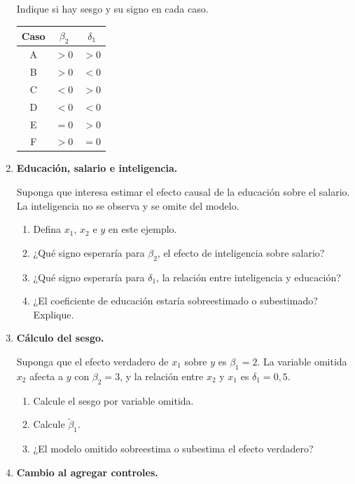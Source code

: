 \documentclass[11pt]{article}
\begin{document}
\begin{enumerate}[label=\textbf{Ejercicio \arabic*.}, leftmargin=*]
Indique si hay sesgo y su signo en cada caso.

\begin{center}
\begin{tabular}{ccc}
\toprule
Caso & $\beta_2$ & $\delta_1$ \\
\midrule
A & $>0$ & $>0$ \\
B & $>0$ & $<0$ \\
C & $<0$ & $>0$ \\
D & $<0$ & $<0$ \\
E & $=0$ & $>0$ \\
F & $>0$ & $=0$ \\
\bottomrule
\end{tabular}
\end{center}

\item \textbf{Educación, salario e inteligencia.}

Suponga que interesa estimar el efecto causal de la educación sobre el salario. La inteligencia no se observa y se omite del modelo.

\begin{enumerate}[label=\alph*)]
    \item Defina $x_1$, $x_2$ e $y$ en este ejemplo.
    \item ¿Qué signo esperaría para $\beta_2$, el efecto de inteligencia sobre salario?
    \item ¿Qué signo esperaría para $\delta_1$, la relación entre inteligencia y educación?
    \item ¿El coeficiente de educación estaría sobreestimado o subestimado? Explique.
\end{enumerate}

\item \textbf{Cálculo del sesgo.}

Suponga que el efecto verdadero de $x_1$ sobre $y$ es $\beta_1=2$. La variable omitida $x_2$ afecta a $y$ con $\beta_2=3$, y la relación entre $x_2$ y $x_1$ es $\delta_1=0{,}5$.

\begin{enumerate}[label=\alph*)]
    \item Calcule el sesgo por variable omitida.
    \item Calcule $\tilde{\beta}_1$.
    \item ¿El modelo omitido sobreestima o subestima el efecto verdadero?
\end{enumerate}

\item \textbf{Cambio al agregar controles.}


\end{enumerate}
\end{document}
